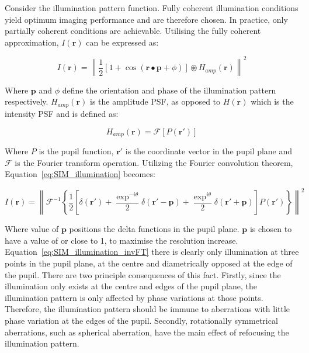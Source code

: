 Consider the illumination pattern function. Fully coherent
illumination conditions yield optimum imaging performance and
are therefore chosen. In practice, only partially coherent 
conditions are achievable. Utilising the fully coherent 
approximation, $I(\textbf{r})$ can be expressed as:

\begin{equation}\label{eq:SIM_illumination}
I(\textbf{r}) = \left\| \frac{1}{2}[1 + \cos(\textbf{r}\bullet\textbf{p} + \phi)]\circledast H_{amp}(\textbf{r}) \right\|^{2}
\end{equation}

Where $\textbf{p}$ and $\phi$ define the orientation and phase of
the illumination pattern respectively. $H_{amp}(\textbf{r})$ is the
amplitude PSF, as opposed to $H(\textbf{r})$ which is the intensity
PSF and is defined as:

\begin{equation}\label{eq:amplitude_PSF}
H_{amp}(\textbf{r}) = \mathcal{F}[P(\textbf{r}')]
\end{equation}

Where $P$ is the pupil function, $\textbf{r}'$ is the coordinate
vector in the pupil plane and $\mathcal{F}$ is the Fourier
transform operation. Utilizing the Fourier convolution 
theorem, Equation~\ref{eq:SIM_illumination} becomes:

\begin{equation}\label{eq:SIM_illumination_invFT}
I(\textbf{r}) = \left\| \mathcal{F}^{-1}\left\{\frac{1}{2}\left[\delta(\textbf{r}') + \frac{\exp^{-i\theta}}{2}\delta(\textbf{r}'-\textbf{p}) + \frac{\exp^{i\theta}}{2}\delta(\textbf{r}'+\textbf{p})\right]P(\textbf{r}')\right\} \right\|^{2}
\end{equation}

Where value of $\textbf{p}$ positions the delta functions in the
pupil plane. $\textbf{p}$ is chosen to have a value of or close
to 1, to maximise the resolution increase. 
Equation~\ref{eq:SIM_illumination_invFT} there is clearly only
illumination at three points in the pupil plane, at the centre 
and diametrically opposed at the edge of the pupil. There are
two principle consequences of this fact. Firstly, since the 
illumination only exists at the centre and edges of the pupil
plane, the illumination pattern is only affected by phase 
variations at those points. Therefore, the illumination pattern
should be immune to aberrations with little phase variation at 
the edges of the pupil. Secondly, rotationally symmetrical 
aberrations, such as spherical aberration, have the main
effect of refocusing the illumination pattern.\cite{booth2015aberrations}

